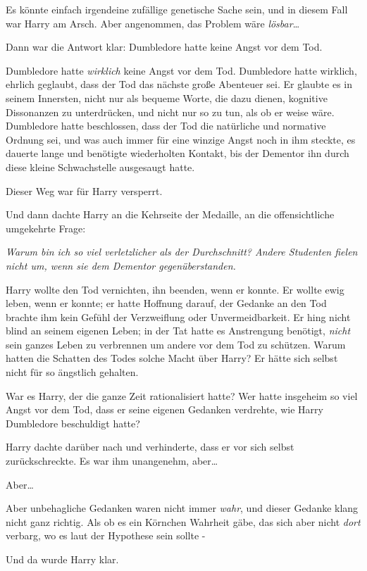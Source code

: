 {Es könnte einfach irgendeine zufällige genetische Sache sein, und in diesem Fall war Harry am Arsch. Aber angenommen, das Problem wäre \emph{lösbar}…

Dann war die Antwort klar: Dumbledore hatte keine Angst vor dem Tod.

Dumbledore hatte \emph{wirklich} keine Angst vor dem Tod. Dumbledore hatte wirklich, ehrlich geglaubt, dass der Tod das nächste große Abenteuer sei. Er glaubte es in seinem Innersten, nicht nur als bequeme Worte, die dazu dienen, kognitive Dissonanzen zu unterdrücken, und nicht nur so zu tun, als ob er weise wäre. Dumbledore hatte beschlossen, dass der Tod die natürliche und normative Ordnung sei, und was auch immer für eine winzige Angst noch in ihm steckte, es dauerte lange und benötigte wiederholten Kontakt, bis der Dementor ihn durch diese kleine Schwachstelle ausgesaugt hatte.

Dieser Weg war für Harry versperrt.

Und dann dachte Harry an die Kehrseite der Medaille, an die offensichtliche umgekehrte Frage:

\emph{\emph{Warum bin ich so viel verletzlicher als der Durchschnitt? Andere Studenten fielen nicht um, wenn sie dem Dementor gegenüberstanden.}}

Harry wollte den Tod vernichten, ihn beenden, wenn er konnte. Er wollte ewig leben, wenn er konnte; er hatte Hoffnung darauf, der Gedanke an den Tod brachte ihm kein Gefühl der Verzweiflung oder Unvermeidbarkeit. Er hing nicht blind an seinem eigenen Leben; in der Tat hatte es Anstrengung benötigt, \emph{nicht} sein ganzes Leben zu verbrennen um andere vor dem Tod zu schützen. Warum hatten die Schatten des Todes solche Macht über Harry? Er hätte sich selbst nicht für so ängstlich gehalten.

War es Harry, der die ganze Zeit rationalisiert hatte? Wer hatte insgeheim so viel Angst vor dem Tod, dass er seine eigenen Gedanken verdrehte, wie Harry Dumbledore beschuldigt hatte?

Harry dachte darüber nach und verhinderte, dass er vor sich selbst zurückschreckte. Es war ihm unangenehm, aber…

Aber…

Aber unbehagliche Gedanken waren nicht immer \emph{wahr}, und dieser Gedanke klang nicht ganz richtig. Als ob es ein Körnchen Wahrheit gäbe, das sich aber nicht \emph{dort} verbarg, wo es laut der Hypothese sein sollte -

Und da wurde Harry klar.

}
